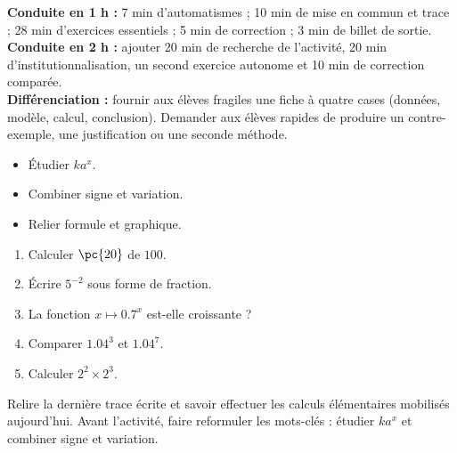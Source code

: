 \ifmxteacher
\begin{method}
\textbf{Conduite en 1 h :} 7 min d'automatismes ; 10 min de mise en commun et trace ; 28 min d'exercices essentiels ; 5 min de correction ; 3 min de billet de sortie.\\
\textbf{Conduite en 2 h :} ajouter 20 min de recherche de l'activité, 20 min d'institutionnalisation, un second exercice autonome et 10 min de correction comparée.\\
\textbf{Différenciation :} fournir aux élèves fragiles une fiche à quatre cases (données, modèle, calcul, conclusion). Demander aux élèves rapides de produire un contre-exemple, une justification ou une seconde méthode.
\end{method}
\fi
{}
\begin{objectives}\begin{itemize}\item Étudier $ka^x$.\item Combiner signe et variation.\item Relier formule et graphique.\end{itemize}\end{objectives}
\begin{fluency}\begin{enumerate}\item Calculer $\pc{20}$ de $100$. \item Écrire $5^{-2}$ sous forme de fraction. \item La fonction $x\mapsto\num{0,7}^x$ est-elle croissante ? \item Comparer $\num{1,04}^3$ et $\num{1,04}^7$. \item Calculer $2^2\times2^3$. \end{enumerate}\end{fluency}
\begin{prerequisites}Relire la dernière trace écrite et savoir effectuer les calculs élémentaires mobilisés aujourd'hui. Avant l'activité, faire reformuler les mots-clés : étudier $ka^x$ et combiner signe et variation.\end{prerequisites}

